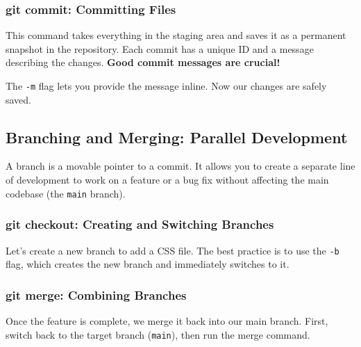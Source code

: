 \documentclass[11pt, a4paper]{article}
\newcommand{\cmd}[1]{\texttt{\textcolor{commandColor}{#1}}}
\begin{document}
\subsubsection{git commit: Committing Files}
This command takes everything in the staging area and saves it as a permanent snapshot in the repository. Each commit has a unique ID and a message describing the changes. \textbf{Good commit messages are crucial!}

The \cmd{-m} flag lets you provide the message inline. Now our changes are safely saved.

\subsection{Branching and Merging: Parallel Development}
A branch is a movable pointer to a commit. It allows you to create a separate line of development to work on a feature or a bug fix without affecting the main codebase (the \cmd{main} branch).

\subsubsection{git checkout: Creating and Switching Branches}
Let's create a new branch to add a CSS file. The best practice is to use the \cmd{-b} flag, which creates the new branch and immediately switches to it.


\subsubsection{git merge: Combining Branches}
Once the feature is complete, we merge it back into our main branch. First, switch back to the target branch (\cmd{main}), then run the merge command.

\end{document}

